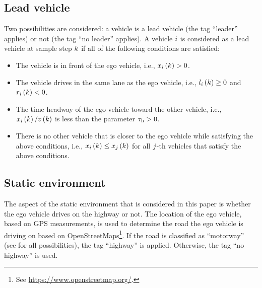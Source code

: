\subsection{Lead vehicle}
\label{sec:lead vehicle}

Two possibilities are considered: a vehicle is a lead vehicle (the tag ``leader'' applies) or not (the tag ``no leader'' applies). A vehicle $i$ is considered as a lead vehicle at sample step $k$ if all of the following conditions are satisfied:
\begin{itemize}
	\item The vehicle is in front of the ego vehicle, i.e., $x_{i}\left(k\right)>0$.
	\item The vehicle drives in the same lane as the ego vehicle, i.e., $l_{i}\left(k\right) \geq 0$ and $r_{i}\left(k\right) < 0$.
	\item The time headway of the ego vehicle toward the other vehicle, i.e., $x_{i}\left(k\right)/v\left(k\right)$ is less than the parameter $\tau_\mathrm{h}>0$.
	\item There is no other vehicle that is closer to the ego vehicle while satisfying the above conditions, i.e., $x_{i}\left(k\right) \leq x_{j}\left(k\right)$ for all $j$-th vehicles that satisfy the above conditions.
\end{itemize}
\cendc



\subsection{Static environment}
\label{sec:static environment}

\cstartc
The aspect of the static environment that is considered in this paper is whether the ego vehicle drives on the highway or not. The location of the ego vehicle, based on GPS measurements, is used to determine the road the ego vehicle is driving on based on OpenStreetMaps\footnote{\cstartc See \url{https://www.openstreetmap.org/}.\cendc}. If the road is classified as ``motorway'' (see \autocite{osm_highway} for all possibilities), the tag ``highway'' is applied. Otherwise, the tag ``no highway'' is used.
\cendc
